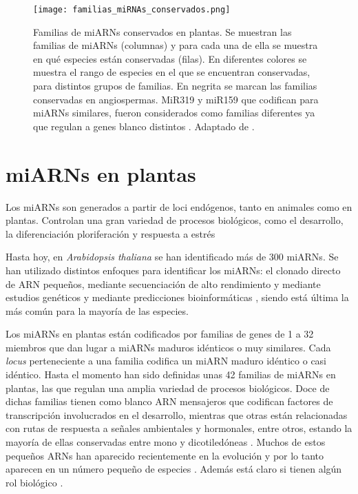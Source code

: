 \begin{figure}[htbp!] 
    \centering    
    \texttt{[image: familias\_miRNAs\_conservados.png]}
    \caption[Familias de miARNs conservados en plantas]{
    Familias de miARNs conservados en plantas.
    Se muestran las familias de miARNs (columnas) y para cada una de ella se muestra en qué especies están conservadas (filas).
    En diferentes colores se muestra el rango de especies en el que se encuentran conservadas, para distintos grupos de familias.
    En negrita se marcan las familias conservadas en angiospermas. 
    MiR319 y miR159 que codifican para miARNs similares, fueron considerados como familias diferentes ya que regulan a genes blanco distintos \citep{Palatnik2007}.
    Adaptado de \citep{citeulike:8816489}.
    }
    \label{fig:familias_miRNAs_conservados}
\end{figure}




\section{miARNs en plantas}

Los miARNs son generados a partir de loci endógenos, tanto en animales como en plantas. 
Controlan una gran variedad de procesos biológicos, como el desarrollo, la diferenciación ploriferación y respuesta a estrés \citep{Voinnet2009669,pmid25118717,citeulike:8816489,pmid12869753,Axtell2008}

Hasta hoy, en \textit{Arabidopsis thaliana} se han identificado más de 300 \citep{Kozomara2014} miARNs.
Se han utilizado distintos enfoques para identificar los miARNs: el clonado directo de ARN pequeños, mediante secuenciación de alto rendimiento y mediante estudios genéticos y mediante predicciones bioinformáticas \citep{citeulike:8816489}, siendo está última la más común para la mayoría de las especies.

Los miARNs en plantas están codificados por familias de genes de 1 a 32 miembros que dan lugar a miARNs maduros idénticos o muy similares.
Cada \textit{locus} perteneciente a una familia codifica un miARN maduro idéntico o casi idéntico.
Hasta el momento han sido definidas unas 42 familias de miARNs en plantas, las que regulan una amplia variedad de procesos biológicos.
Doce de dichas familias tienen como blanco ARN mensajeros que codifican factores de transcripción involucrados en el desarrollo, mientras que otras están relacionadas con rutas de respuesta a señales ambientales y hormonales, entre otros, estando la mayoría de ellas conservadas entre mono y dicotiledóneas \citep{Jones-Rhoades2006}.
Muchos de estos pequeños ARNs han aparecido recientemente en la evolución y por lo tanto aparecen en un número pequeño de especies \citep{Axtell2008,Axtell2008343}. Además está claro si tienen algún rol biológico \citep{Axtell2008343,citeulike:8816489}.

